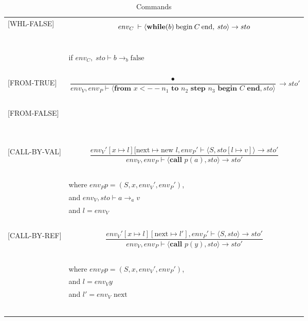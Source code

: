 \begin{longtable}{l l}
[WHL-FALSE] & \[env_C \: \vdash \langle \text{\textbf{while}}(b) \: \text{begin} \: C \: \text{end}, \: sto \rangle \rightarrow sto\] \\
~ & ~ \\
~ & \indent\indent if $env_C, \; sto \vdash b \rightarrow_b \text{false}$ \\
~ & ~ \\

[FROM-TRUE] & \[\frac{•}{env_V, env_P \vdash \langle \textbf{from } x <-- n_1 \textbf{ to } n_2 \textbf{ step } n_3 \textbf{ begin } C \textbf{ end}, sto\rangle} \rightarrow sto'\] \\
~ & ~ \\

[FROM-FALSE] & ~ \\
~ & ~ \\
~ & ~ \\

[CALL-BY-VAL] & \[\frac{env_V'[x \mapsto l][\text{next} \mapsto \text{new } l, env_P' \vdash \langle S, sto[l \mapsto v] \rangle \rightarrow sto'}{env_V, env_P \vdash \langle \textbf{call } p(a), sto \rangle \rightarrow sto'}\] \\
~ & ~ \\
~ & \indent\indent where $env_P p = (S, x, env_V', env_P')$, \\
~ & \indent\indent and $env_V, sto \vdash a \rightarrow_a v$ \\
~ & \indent\indent and $l = env_V$ \\
~ & ~ \\

[CALL-BY-REF] & \[\frac{env_V'[x \mapsto l][\text{next} \mapsto l'], env_P' \vdash \langle S, sto \rangle \rightarrow sto'}{env_V, env_P \vdash \langle \textbf{call } p(y), sto \rangle \rightarrow sto'}\] \\
~ & ~ \\
~ & \indent\indent where $env_P p = (S, x, env_V', env_P')$, \\
~ & \indent\indent and $l = env_V y$ \\
~ & \indent\indent and $l' = env_V \text{ next}$ \\
~ & ~ \\

\caption{Commands}
\end{longtable}

